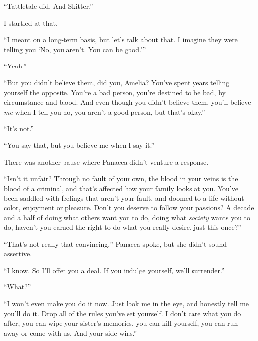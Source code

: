 ``Tattletale did.  And Skitter.''



I startled at that.



``I meant on a long-term basis, but let's talk about that.  I imagine they were telling you `No, you aren't.  You can be good.'''



``Yeah.''



``But you didn't believe them, did you, Amelia?  You've spent years telling yourself the opposite.  You're a bad person, you're destined to be bad, by circumstance and blood.  And even though you didn't believe them, you'll believe \emph{me} when I tell you no, you aren't a good person, but that's okay.''



``It's not.''



``You say that, but you believe me when I say it.''



There was another pause where Panacea didn't venture a response.



``Isn't it unfair?  Through no fault of your own, the blood in your veins is the blood of a criminal, and that's affected how your family looks at you.  You've been saddled with feelings that aren't your fault, and doomed to a life without color, enjoyment or pleasure.  Don't you deserve to follow your passions?  A decade and a half of doing what others want you to do, doing what \emph{society} wants you to do, haven't you earned the right to do what you really desire, just this once?''



``That's not really that convincing,'' Panacea spoke, but she didn't sound assertive.



``I know.  So I'll offer you a deal.  If you indulge yourself, we'll surrender.''



``What?''



``I won't even make you do it now.  Just look me in the eye, and honestly tell me you'll do it. Drop all of the rules you've set yourself.  I don't care what you do after, you can wipe your sister's memories, you can kill yourself, you can run away or come with us.  And your side wins.''



